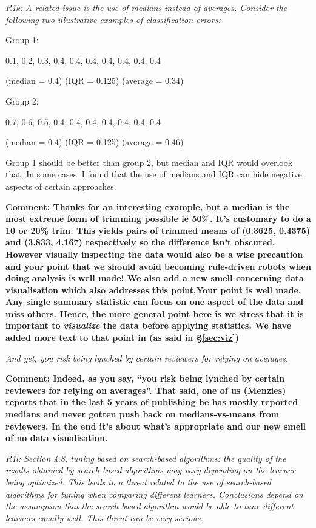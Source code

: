 \documentclass[preprint,10pt]{elsarticle}
\begin{document}
{\em R1k:  A related issue is the use of medians instead of averages. Consider the following two illustrative examples of classification errors:

Group 1: 

0.1, 0.2, 0.3, 0.4, 0.4, 0.4, 0.4, 0.4, 0.4, 0.4

(median = 0.4)
(IQR = 0.125)
(average = 0.34)

Group 2:

0.7, 0.6, 0.5, 0.4, 0.4, 0.4, 0.4, 0.4, 0.4, 0.4

(median = 0.4)
(IQR = 0.125)
(average = 0.46)

Group 1 should be better than group 2, but median and IQR would overlook that. In some cases, I found that the use of medians and IQR can hide negative aspects of certain approaches. }

{\bf Comment: Thanks for an interesting example, but a median is the most extreme form of trimming possible ie 50\%.  It's customary to do a 10 or 20\% trim.  This yields pairs of trimmed means of (0.3625, 0.4375) and (3.833, 4.167) respectively so the difference isn't obscured.  However visually inspecting the data would also be a wise precaution and your point that we should avoid becoming rule-driven robots when doing analysis is well made!  We also add a new smell concerning data visualisation which also addresses this point.Your point is well made. Any single summary statistic can focus on one aspect of the data and miss others. Hence, the more general point here is we stress that it is important to {\em visualize} the data before applying statistics. We have added more text to that point in (as said in \S\vref{sec:viz})}

{\em And yet, you risk being lynched by certain reviewers for relying on averages.}

{\bf Comment: Indeed, as you say, ``you risk being lynched by certain reviewers for relying on averages''.  That said, one of us (Menzies) reports that in the last 5 years of publishing he has mostly reported medians and never gotten push back on medians-vs-means from reviewers. In the end it's about what's appropriate and our new smell of no data visualisation.   
}

{\em R1l:  Section 4.8, tuning based on search-based algorithms: the quality of the results obtained by search-based algorithms may vary depending on the learner being optimized. This leads to a threat related to the use of search-based algorithms for tuning when comparing different learners. Conclusions depend on the assumption that the search-based algorithm would be able to tune different learners equally well. This threat can be very serious.}
\end{document}
